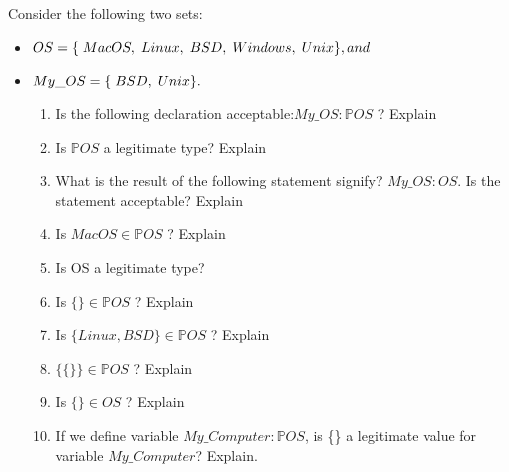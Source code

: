 \documentclass[12pt]{article}
\begin{document}
\noindent \text Consider the following two sets:
\begin{itemize}
      \item
            \(
            OS =
            \{
            \hspace{1mm} MacOS,
            \hspace{1mm} Linux,
            \hspace{1mm} BSD,
            \hspace{1mm} Windows,
            \hspace{1mm} Unix
            \}, and
            \)
      \item
            \(
            My\_OS =
            \{
            \hspace{1mm} BSD,
            \hspace{1mm} Unix
            \}.
            \)
            \begin{enumerate}
                  \item Is the following declaration acceptable:$My\_OS : \mathbb{P} OS$ ? Explain

                  \item Is $\mathbb{P} OS$ a legitimate type? Explain

                  \item What is the result of the following statement signify?  $My\_OS : OS.$ Is the statement acceptable? Explain

                  \item Is $ MacOS \in \mathbb{P} OS$ ? Explain

                  \item Is OS a legitimate type?
                   
                  \item Is $ \{\} \in \mathbb{P} OS$ ? Explain

                  \item Is $ \{Linux, BSD\} \in \mathbb{P} OS$ ? Explain
                        
                  \item $ \{\{\}\} \in \mathbb{P} OS$ ? Explain
                  
                  \item Is $ \{\} \in OS$ ? Explain
                  
                  \item If we define variable $My\_Computer : \mathbb{P} OS$, is \{\} a legitimate value for variable $My\_Computer$? Explain.
                  

\end{enumerate}
\end{itemize}
\end{document}
